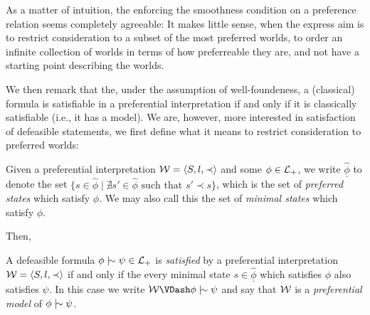 As a matter of intuition, the enforcing the smoothness condition on a preference relation seems completely agreeable: It
makes little sense, when the express aim is to restrict consideration to a subset of the most preferred worlds, to order
an infinite collection of worlds in terms of how preferreable they are, and not have a starting point describing the
 worlds.

We then remark that the, under the assumption of well-foundeness, a (classical) formula is satisfiable in a preferential
interpretation if and only if it is classically satisfiable (i.e., it has a model). We are, however, more interested in
satisfaction of defeasible statements, we first define what it means to restrict consideration to preferred worlds:

\begin{definition}
	\label{definition:state-minimal}

	Given a preferential interpretation $\mathcal{W} = \langle S,l,\prec \rangle$ and some $\phi \in \mathcal{L}_+$, we write $\underline{\hat{\phi}}$ to denote the set
	$\{s \in \hat{\phi}\mid \nexists s' \in \hat{\phi}\text{ such that }s' \prec s \}$, which is the set of \textit{preferred
	states} which satisfy $\phi$. We may also call this the set of \textit{minimal states} which satisfy $\phi$.
\end{definition}

Then,

\begin{definition}
	\label{definition:preferentially-satisfiable}

	A defeasible formula $\phi \twiddle \psi \in \Lang$ is \emph{satisfied} by a preferential interpretation $\mathcal{W} = \langle S,l,\prec \rangle$ if and
	only if the every minimal state $s \in \underline{\hat{\phi}}$ which satisfies $\phi$ also satisfies $\psi$. In this
	case we write $\pin \VDash \phi \twiddle \psi$ and say that $\mathcal{W}$ is a \emph{preferential model} of $\phi \twiddle \psi$.
\end{definition}


